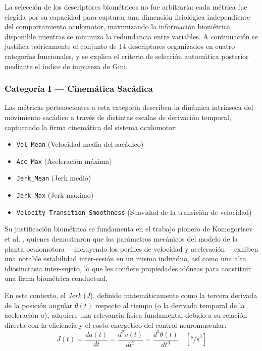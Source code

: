 La selección de los descriptores biométricos no fue arbitraria: cada métrica fue elegida por su capacidad para capturar una dimensión fisiológica independiente del comportamiento oculomotor, maximizando la información biométrica disponible mientras se minimiza la redundancia entre variables. A continuación se justifica teóricamente el conjunto de 14 descriptores organizados en cuatro categorías funcionales, y se explica el criterio de selección automática posterior mediante el índice de impureza de Gini.

\subsubsection*{Categoría I — Cinemática Sacádica}
Las métricas pertenecientes a esta categoría describen la dinámica intrínseca del movimiento sacádico a través de distintas escalas de derivación temporal, capturando la firma cinemática del sistema oculomotor:
\begin{itemize}
	\item \texttt{Vel\_Mean} (Velocidad media del sacádico)
	\item \texttt{Acc\_Max} (Aceleración máxima)
	\item \texttt{Jerk\_Mean} (Jerk medio)
	\item \texttt{Jerk\_Max} (Jerk máximo)
	\item \texttt{Velocity\_Transition\_Smoothness} (Suavidad de la transición de velocidad)
\end{itemize}

Su justificación biométrica se fundamenta en el trabajo pionero de Komogortsev et al. \cite{komogortsev2010}, quienes demostraron que los parámetros mecánicos del modelo de la planta oculomotora —incluyendo los perfiles de velocidad y aceleración— exhiben una notable estabilidad inter-sesión en un mismo individuo, así como una alta idiosincrasia inter-sujeto, lo que les confiere propiedades idóneas para constituir una firma biométrica conductual. 

En este contexto, el \textit{Jerk} ($J$), definido matemáticamente como la tercera derivada de la posición angular $\theta(t)$ respecto al tiempo (o la derivada temporal de la aceleración $a$), adquiere una relevancia física fundamental debido a su relación directa con la eficiencia y el costo energético del control neuromuscular:
\begin{equation}
	J(t) = \frac{da(t)}{dt} = \frac{d^2v(t)}{dt^2} = \frac{d^3\theta(t)}{dt^3} \quad \left[\text{°/s}^3\right] \tag{18}
\end{equation}

